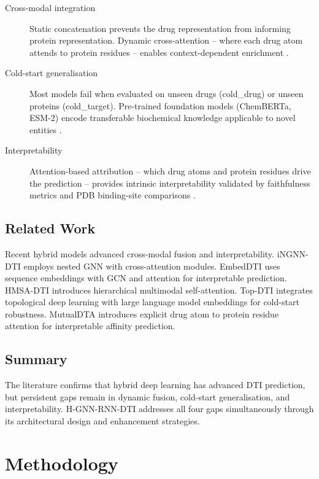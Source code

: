 \documentclass[12pt,a4paper,oneside]{report}
\begin{document}
\begin{description}
  \item[Cross-modal integration] Static concatenation prevents the drug representation from informing protein representation. Dynamic cross-attention -- where each drug atom attends to protein residues -- enables context-dependent enrichment \citep{sun2024ingnn, quan2025mfca}.
  \item[Cold-start generalisation] Most models fail when evaluated on unseen drugs (cold\_drug) or unseen proteins (cold\_target). Pre-trained foundation models (ChemBERTa, ESM-2) encode transferable biochemical knowledge applicable to novel entities \citep{lee2024dlm, talo2025topdti}.
  \item[Interpretability] Attention-based attribution -- which drug atoms and protein residues drive the prediction -- provides intrinsic interpretability validated by faithfulness metrics and PDB binding-site comparisons \citep{yang2024ehign, yuan2025mutualdta}.
\end{description}

\section{Related Work}

Recent hybrid models advanced cross-modal fusion and interpretability. iNGNN-DTI \citep{sun2024ingnn} employs nested GNN with cross-attention modules. EmbedDTI \citep{jin2021} uses sequence embeddings with GCN and attention for interpretable prediction. HMSA-DTI \citep{bian2024} introduces hierarchical multimodal self-attention. Top-DTI \citep{talo2025topdti} integrates topological deep learning with large language model embeddings for cold-start robustness. MutualDTA \citep{yuan2025mutualdta} introduces explicit drug atom to protein residue attention for interpretable affinity prediction.

\section{Summary}

The literature confirms that hybrid deep learning has advanced DTI prediction, but persistent gaps remain in dynamic fusion, cold-start generalisation, and interpretability. H-GNN-RNN-DTI addresses all four gaps simultaneously through its architectural design and enhancement strategies.

\chapter{Methodology}
\end{document}
